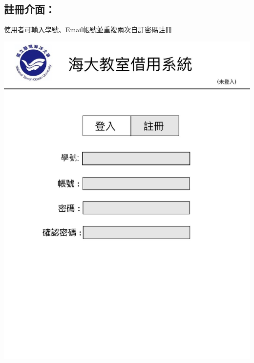 \documentclass{article}
\begin{document}
\begin{minipage}{0.6\linewidth}
	\subsection*{註冊介面：}使用者可輸入學號、Email帳號並重複兩次自訂密碼註冊
\end{minipage}
\begin{minipage}{0.4\linewidth}
	\includegraphics[height=0.4\textheight]{Regester_GUI.jpg}
\end{minipage}

\newpage
\end{document}
